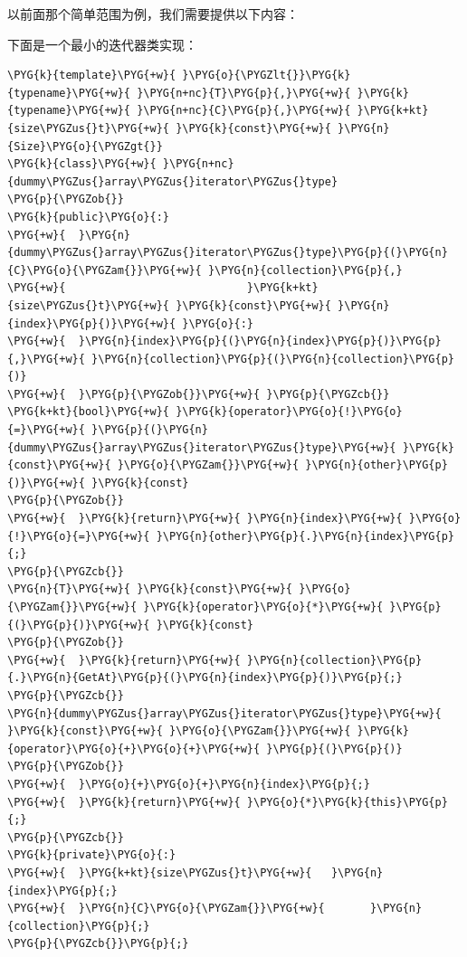 
以前面那个简单范围为例，我们需要提供以下内容：



下面是一个最小的迭代器类实现：



\begin{codeblockbg}
\begin{Verbatim}[commandchars=\\\{\},breaklines=true,breakanywhere=true,fontsize=\codefont,xleftmargin=17bp]
\PYG{k}{template}\PYG{+w}{ }\PYG{o}{\PYGZlt{}}\PYG{k}{typename}\PYG{+w}{ }\PYG{n+nc}{T}\PYG{p}{,}\PYG{+w}{ }\PYG{k}{typename}\PYG{+w}{ }\PYG{n+nc}{C}\PYG{p}{,}\PYG{+w}{ }\PYG{k+kt}{size\PYGZus{}t}\PYG{+w}{ }\PYG{k}{const}\PYG{+w}{ }\PYG{n}{Size}\PYG{o}{\PYGZgt{}}
\PYG{k}{class}\PYG{+w}{ }\PYG{n+nc}{dummy\PYGZus{}array\PYGZus{}iterator\PYGZus{}type}
\PYG{p}{\PYGZob{}}
\PYG{k}{public}\PYG{o}{:}
\PYG{+w}{  }\PYG{n}{dummy\PYGZus{}array\PYGZus{}iterator\PYGZus{}type}\PYG{p}{(}\PYG{n}{C}\PYG{o}{\PYGZam{}}\PYG{+w}{ }\PYG{n}{collection}\PYG{p}{,}
\PYG{+w}{                            }\PYG{k+kt}{size\PYGZus{}t}\PYG{+w}{ }\PYG{k}{const}\PYG{+w}{ }\PYG{n}{index}\PYG{p}{)}\PYG{+w}{ }\PYG{o}{:}
\PYG{+w}{  }\PYG{n}{index}\PYG{p}{(}\PYG{n}{index}\PYG{p}{)}\PYG{p}{,}\PYG{+w}{ }\PYG{n}{collection}\PYG{p}{(}\PYG{n}{collection}\PYG{p}{)}
\PYG{+w}{  }\PYG{p}{\PYGZob{}}\PYG{+w}{ }\PYG{p}{\PYGZcb{}}
\PYG{k+kt}{bool}\PYG{+w}{ }\PYG{k}{operator}\PYG{o}{!}\PYG{o}{=}\PYG{+w}{ }\PYG{p}{(}\PYG{n}{dummy\PYGZus{}array\PYGZus{}iterator\PYGZus{}type}\PYG{+w}{ }\PYG{k}{const}\PYG{+w}{ }\PYG{o}{\PYGZam{}}\PYG{+w}{ }\PYG{n}{other}\PYG{p}{)}\PYG{+w}{ }\PYG{k}{const}
\PYG{p}{\PYGZob{}}
\PYG{+w}{  }\PYG{k}{return}\PYG{+w}{ }\PYG{n}{index}\PYG{+w}{ }\PYG{o}{!}\PYG{o}{=}\PYG{+w}{ }\PYG{n}{other}\PYG{p}{.}\PYG{n}{index}\PYG{p}{;}
\PYG{p}{\PYGZcb{}}
\PYG{n}{T}\PYG{+w}{ }\PYG{k}{const}\PYG{+w}{ }\PYG{o}{\PYGZam{}}\PYG{+w}{ }\PYG{k}{operator}\PYG{o}{*}\PYG{+w}{ }\PYG{p}{(}\PYG{p}{)}\PYG{+w}{ }\PYG{k}{const}
\PYG{p}{\PYGZob{}}
\PYG{+w}{  }\PYG{k}{return}\PYG{+w}{ }\PYG{n}{collection}\PYG{p}{.}\PYG{n}{GetAt}\PYG{p}{(}\PYG{n}{index}\PYG{p}{)}\PYG{p}{;}
\PYG{p}{\PYGZcb{}}
\PYG{n}{dummy\PYGZus{}array\PYGZus{}iterator\PYGZus{}type}\PYG{+w}{ }\PYG{k}{const}\PYG{+w}{ }\PYG{o}{\PYGZam{}}\PYG{+w}{ }\PYG{k}{operator}\PYG{o}{+}\PYG{o}{+}\PYG{+w}{ }\PYG{p}{(}\PYG{p}{)}
\PYG{p}{\PYGZob{}}
\PYG{+w}{  }\PYG{o}{+}\PYG{o}{+}\PYG{n}{index}\PYG{p}{;}
\PYG{+w}{  }\PYG{k}{return}\PYG{+w}{ }\PYG{o}{*}\PYG{k}{this}\PYG{p}{;}
\PYG{p}{\PYGZcb{}}
\PYG{k}{private}\PYG{o}{:}
\PYG{+w}{  }\PYG{k+kt}{size\PYGZus{}t}\PYG{+w}{   }\PYG{n}{index}\PYG{p}{;}
\PYG{+w}{  }\PYG{n}{C}\PYG{o}{\PYGZam{}}\PYG{+w}{       }\PYG{n}{collection}\PYG{p}{;}
\PYG{p}{\PYGZcb{}}\PYG{p}{;}
\end{Verbatim}
\end{codeblockbg}


